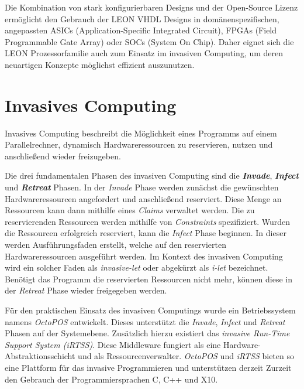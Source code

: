 Die Kombination von stark konfigurierbaren Designs und der Open-Source Lizenz ermöglicht den Gebrauch der
LEON VHDL Designs in domänenspezifischen, angepassten ASICs (Application-Specific Integrated Circuit),
FPGAs (Field Programmable Gate Array) oder SOCs (System On Chip). Daher eignet sich die LEON Prozessorfamilie
auch zum Einsatz im invasiven Computing, um deren neuartigen Konzepte möglichst effizient auszunutzen.
\cite{sparcv8Eval}

\section{Invasives Computing}

Invasives Computing beschreibt die Möglichkeit eines Programms auf einem Parallelrechner,
dynamisch Hardwareressourcen zu reservieren, nutzen und anschließend wieder freizugeben.\cite{octopos}

Die drei fundamentalen Phasen des invasiven Computing sind die \textit{\textbf{Invade}}, \textit{\textbf{Infect}}
und \textit{\textbf{Retreat}} Phasen. In der \textit{Invade} Phase werden zunächst die gewünschten
Hardwareressourcen angefordert und anschließend reserviert. Diese Menge an Ressourcen kann dann mithilfe
eines \textit{Claims} verwaltet werden. Die zu reservierenden Ressourcen werden mithilfe von \textit{Constraints}
spezifiziert.
Wurden die Ressourcen erfolgreich reserviert, kann die \textit{Infect}
Phase beginnen. In dieser werden Ausführungsfaden erstellt,
welche auf den reservierten Hardwareressourcen ausgeführt werden. Im Kontext des invasiven Computing wird ein solcher
Faden als \textit{invasive-let} oder abgekürzt als \textit{i-let} bezeichnet\cite{invasiveCommonTerms}.
Benötigt das Programm die reservierten Ressourcen nicht mehr, können diese in der \textit{Retreat} Phase wieder
freigegeben werden.\cite{octopos}

Für den praktischen Einsatz des invasiven Computings wurde ein Betriebssystem namens \textit{OctoPOS} entwickelt. 
Dieses unterstützt die \textit{Invade}, \textit{Infect} und \textit{Retreat} Phasen auf der Systemebene.
Zusätzlich hierzu existiert das \textit{invasive Run-Time Support System (iRTSS)}. Diese Middleware
fungiert als eine Hardware-Abstraktionsschicht und als Ressourcenverwalter.
\textit{OctoPOS} und \textit{iRTSS} bieten so eine Plattform für das invasive Programmieren und
unterstützen derzeit Zurzeit den Gebrauch der Programmiersprachen C, C++ und X10.
\cite{octopos}\cite{invasiveManyCore}\cite{invasiveRISC}

